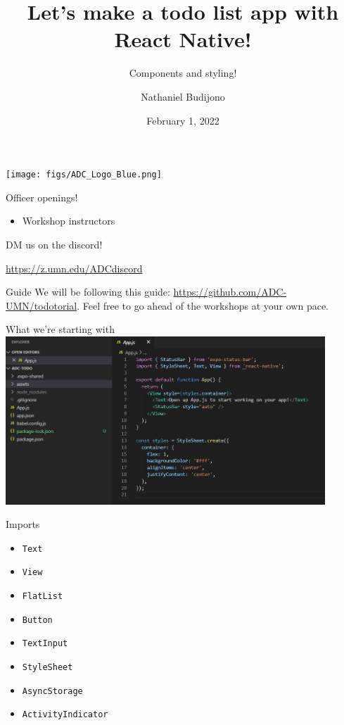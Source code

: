 \documentclass{beamer}
\title{Let's make a todo list app with React Native!}
\subtitle{Components and styling!}
\author{Nathaniel Budijono}
\date{February 1, 2022}
\institute{UMN ADC}
\begin{document}
\begin{frame}
    \titlepage
    \texttt{[image: figs/ADC\_Logo\_Blue.png]}
\end{frame}

\begin{frame}{Officer openings!}
	\begin{itemize}
		\item Workshop instructors
	\end{itemize}

	\bigskip

	DM us on the discord!

	\bigskip

	\href{https://z.umn.edu/ADCdiscord}{https://z.umn.edu/ADCdiscord}
\end{frame}

\begin{frame}{Guide}
	We will be following this guide: \href{https://github.com/ADC-UMN/todotorial}{https://github.com/ADC-UMN/todotorial}. Feel free to go ahead of the workshops at your own pace.
\end{frame}

\begin{frame}{What we're starting with}
	\centering
	\includegraphics[width=0.9\textwidth]{figs/expo-blank.png}	
\end{frame}

\begin{frame}{Imports}
	\begin{itemize}
		\item \texttt{Text}
		\item \texttt{View}
		\item \texttt{FlatList}
		\item \texttt{Button}
		\item \texttt{TextInput}
		\item \texttt{StyleSheet}
		\item \texttt{AsyncStorage}
		\item \texttt{ActivityIndicator}
	\end{itemize}
\end{frame}
\end{document}
